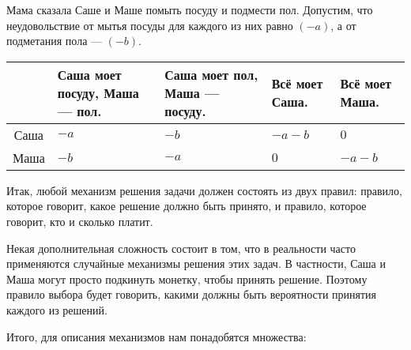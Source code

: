\begin{myex} \label{sm_posuda} Мама сказала Саше и Маше помыть посуду и подмести пол. Допустим, что неудовольствие от мытья посуды для каждого из них равно $ (-a) $, а от подметания пола — $ (-b) $.

\begin{tabular}{c|p{2.2 cm}p{2.2 cm}p{2.2 cm}p{2.2 cm}}
& Саша моет посуду, Маша — пол. & Саша моет пол, Маша — посуду. & Всё моет Саша. & Всё моет Маша. \\
\hline
Саша & $ -a $ & $ -b $ & $ -a-b $ & $ 0 $ \\
Маша & $ -b $ & $ -a $ & $ 0 $ & $ -a-b $ \\
\end{tabular}

\end{myex}


Итак, любой механизм решения задачи должен состоять из двух правил: правило, которое говорит, какое решение должно быть принято, и правило, которое говорит, кто и сколько платит.

Некая дополнительная сложность состоит в том, что в реальности часто применяются случайные механизмы решения этих задач. В частности, Саша и Маша могут просто подкинуть монетку, чтобы принять решение. Поэтому правило выбора будет говорить, какими должны быть вероятности принятия каждого из решений.

Итого, для описания механизмов нам понадобятся множества:

